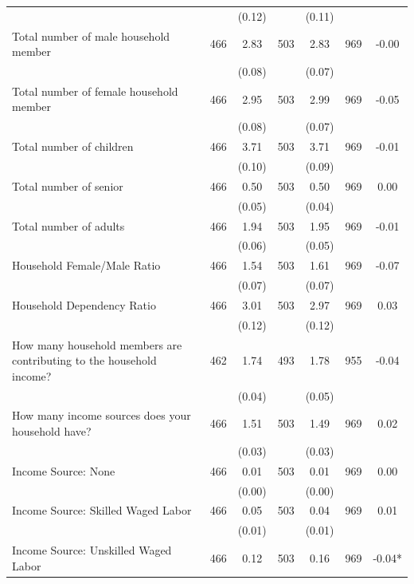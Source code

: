 \begin{tabular}{@{\extracolsep{5pt}}lcccccc}
 &   & (0.12)  &   & (0.11)  &   &  \\ [1ex]
Total number of male household member   & 466    & 2.83    & 503    & 2.83    & 969    & -0.00   \\
 &   & (0.08)  &   & (0.07)  &   &  \\ [1ex]
Total number of female household member   & 466    & 2.95    & 503    & 2.99    & 969    & -0.05   \\
 &   & (0.08)  &   & (0.07)  &   &  \\ [1ex]
Total number of children   & 466    & 3.71    & 503    & 3.71    & 969    & -0.01   \\
 &   & (0.10)  &   & (0.09)  &   &  \\ [1ex]
Total number of senior   & 466    & 0.50    & 503    & 0.50    & 969    & 0.00   \\
 &   & (0.05)  &   & (0.04)  &   &  \\ [1ex]
Total number of adults   & 466    & 1.94    & 503    & 1.95    & 969    & -0.01   \\
 &   & (0.06)  &   & (0.05)  &   &  \\ [1ex]
Household Female/Male Ratio   & 466    & 1.54    & 503    & 1.61    & 969    & -0.07   \\
 &   & (0.07)  &   & (0.07)  &   &  \\ [1ex]
Household Dependency Ratio   & 466    & 3.01    & 503    & 2.97    & 969    & 0.03   \\
 &   & (0.12)  &   & (0.12)  &   &  \\ [1ex]
How many household members are contributing to the household income?   & 462    & 1.74    & 493    & 1.78    & 955    & -0.04   \\
 &   & (0.04)  &   & (0.05)  &   &  \\ [1ex]
How many income sources does your household have?   & 466    & 1.51    & 503    & 1.49    & 969    & 0.02   \\
 &   & (0.03)  &   & (0.03)  &   &  \\ [1ex]
Income Source: None   & 466    & 0.01    & 503    & 0.01    & 969    & 0.00   \\
 &   & (0.00)  &   & (0.00)  &   &  \\ [1ex]
Income Source: Skilled Waged Labor   & 466    & 0.05    & 503    & 0.04    & 969    & 0.01   \\
 &   & (0.01)  &   & (0.01)  &   &  \\ [1ex]
Income Source: Unskilled Waged Labor   & 466    & 0.12    & 503    & 0.16    & 969    & -0.04*   \\

\end{tabular}

